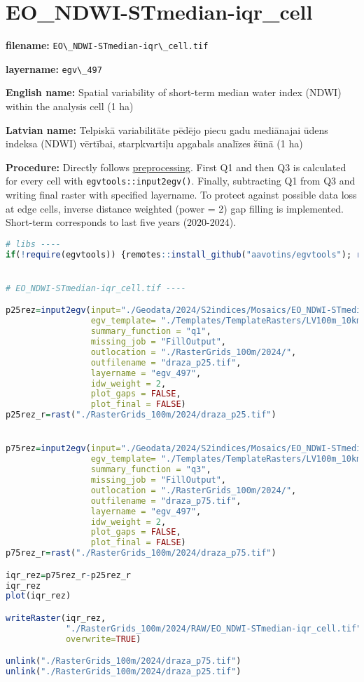\documentclass[
]{book}
\newcommand{\passthrough}[1]{#1}
\begin{document}
\section{EO\_NDWI-STmedian-iqr\_cell}\label{ch06.497}

\textbf{filename:} \passthrough{\lstinline!EO\_NDWI-STmedian-iqr\_cell.tif!}

\textbf{layername:} \passthrough{\lstinline!egv\_497!}

\textbf{English name:} Spatial variability of short-term median water index (NDWI) within the analysis cell (1 ha)

\textbf{Latvian name:} Telpiskā variabilitāte pēdējo piecu gadu mediānajai ūdens indeksa (NDWI) vērtībai, starpkvartiļu apgabals analīzes šūnā (1 ha)

\textbf{Procedure:} Directly follows \hyperref[Ch04.13]{preprocessing}. First Q1 and then Q3
is calculated for every cell with \passthrough{\lstinline!egvtools::input2egv()!}. Finally, subtracting
Q1 from Q3 and writing final raster with specified layername. To protect against possible data loss at edge cells,
inverse distance weighted (power = 2) gap filling is implemented. Short-term corresponds
to last five years (2020-2024).

\begin{lstlisting}[language=R]
# libs ----
if(!require(egvtools)) {remotes::install_github("aavotins/egvtools"); require(egvtools)}


# EO_NDWI-STmedian-iqr_cell.tif ----

p25rez=input2egv(input="./Geodata/2024/S2indices/Mosaics/EO_NDWI-STmedian.tif",
                 egv_template= "./Templates/TemplateRasters/LV100m_10km.tif",
                 summary_function = "q1",
                 missing_job = "FillOutput",
                 outlocation = "./RasterGrids_100m/2024/",
                 outfilename = "draza_p25.tif",
                 layername = "egv_497",
                 idw_weight = 2,
                 plot_gaps = FALSE,
                 plot_final = FALSE)
p25rez_r=rast("./RasterGrids_100m/2024/draza_p25.tif")


p75rez=input2egv(input="./Geodata/2024/S2indices/Mosaics/EO_NDWI-STmedian.tif",
                 egv_template= "./Templates/TemplateRasters/LV100m_10km.tif",
                 summary_function = "q3",
                 missing_job = "FillOutput",
                 outlocation = "./RasterGrids_100m/2024/",
                 outfilename = "draza_p75.tif",
                 layername = "egv_497",
                 idw_weight = 2,
                 plot_gaps = FALSE,
                 plot_final = FALSE)
p75rez_r=rast("./RasterGrids_100m/2024/draza_p75.tif")

iqr_rez=p75rez_r-p25rez_r
iqr_rez
plot(iqr_rez)

writeRaster(iqr_rez,
            "./RasterGrids_100m/2024/RAW/EO_NDWI-STmedian-iqr_cell.tif",
            overwrite=TRUE)

unlink("./RasterGrids_100m/2024/draza_p75.tif")
unlink("./RasterGrids_100m/2024/draza_p25.tif")
\end{lstlisting}
\end{document}
